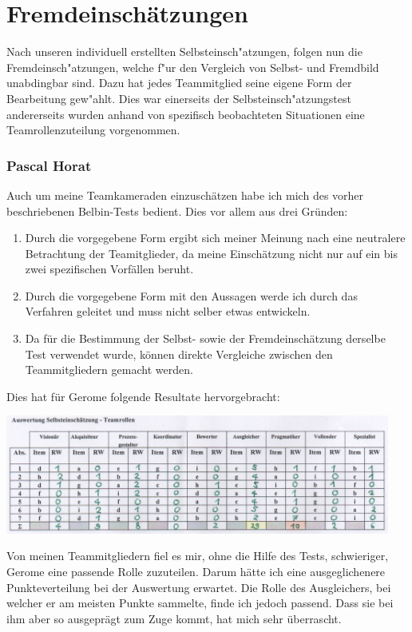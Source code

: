 \chapter{Fremdeinschätzungen}\label{Fremdeinschaetzung}
Nach unseren individuell erstellten Selbsteinsch"atzungen, folgen nun die Fremdeinsch"atzungen, welche f"ur
den Vergleich von Selbst- und Fremdbild unabdingbar sind.
Dazu hat jedes Teammitglied seine eigene Form der Bearbeitung gew"ahlt. Dies war einerseits der Selbsteinsch"atzungstest andererseits wurden anhand von spezifisch beobachteten Situationen eine Teamrollenzuteilung
vorgenommen.
\subsection*{Pascal Horat}

Auch um meine Teamkameraden einzuschätzen habe ich mich des vorher beschriebenen Belbin-Tests bedient. Dies vor allem aus drei Gründen:
\begin{enumerate}
\item Durch die vorgegebene Form ergibt sich meiner Meinung nach eine neutralere Betrachtung der Teamitglieder, da meine Einschätzung nicht nur auf ein bis zwei spezifischen Vorfällen beruht.
\item Durch die vorgegebene Form mit den Aussagen werde ich durch das Verfahren geleitet und muss nicht selber etwas entwickeln.
\item Da für die Bestimmung der Selbst- sowie der Fremdeinschätzung derselbe Test verwendet wurde, können direkte Vergleiche zwischen den Teammitgliedern gemacht werden.
\end{enumerate}

Dies hat für Gerome folgende Resultate hervorgebracht:


\includegraphics[height=39mm]{images/FremdeinschaetzungHoratKamga.png}

Von meinen Teammitgliedern fiel es mir, ohne die Hilfe des Tests, schwieriger, Gerome eine passende Rolle zuzuteilen. Darum hätte ich eine ausgeglichenere Punkteverteilung bei der Auswertung erwartet. Die Rolle des Ausgleichers, bei welcher er am meisten Punkte sammelte, finde ich jedoch passend. Dass sie bei ihm aber so ausgeprägt zum Zuge kommt, hat mich sehr überrascht.


